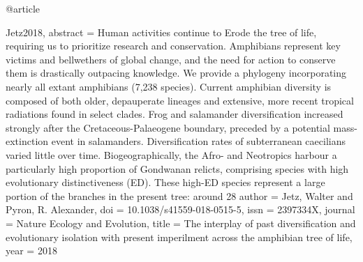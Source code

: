 {{{{{{@article{Jetz2018,
abstract = {Human activities continue to Erode the tree of life, requiring us to prioritize research and conservation. Amphibians represent key victims and bellwethers of global change, and the need for action to conserve them is drastically outpacing knowledge. We provide a phylogeny incorporating nearly all extant amphibians (7,238 species). Current amphibian diversity is composed of both older, depauperate lineages and extensive, more recent tropical radiations found in select clades. Frog and salamander diversification increased strongly after the Cretaceous-Palaeogene boundary, preceded by a potential mass-extinction event in salamanders. Diversification rates of subterranean caecilians varied little over time. Biogeographically, the Afro- and Neotropics harbour a particularly high proportion of Gondwanan relicts, comprising species with high evolutionary distinctiveness (ED). These high-ED species represent a large portion of the branches in the present tree: around 28%
author = {Jetz, Walter and Pyron, R. Alexander},
doi = {10.1038/s41559-018-0515-5},
issn = {2397334X},
journal = {Nature Ecology and Evolution},
title = {{The interplay of past diversification and evolutionary isolation with present imperilment across the amphibian tree of life}},
year = {2018}
}

}}}}}}}
